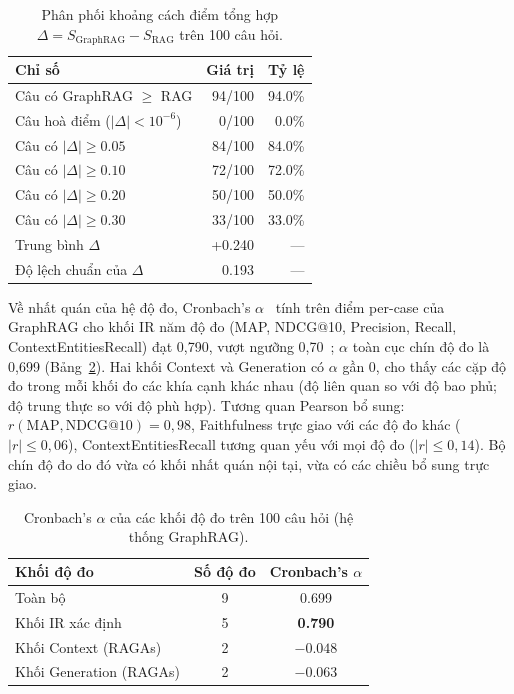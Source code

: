 \begin{table}[h]
\centering
\caption{Phân phối khoảng cách điểm tổng hợp $\Delta = S_{\text{GraphRAG}} - S_{\text{RAG}}$ trên 100 câu hỏi.}
\label{tab:discrimination}
\begin{tabular}{lrr}
\hline
\textbf{Chỉ số} & \textbf{Giá trị} & \textbf{Tỷ lệ} \\
\hline
Câu có GraphRAG $\geq$ RAG & 94/100 & 94.0\% \\
Câu hoà điểm ($|\Delta| < 10^{-6}$) &  0/100 &  0.0\% \\
Câu có $|\Delta| \geq 0.05$ & 84/100 & 84.0\% \\
Câu có $|\Delta| \geq 0.10$ & 72/100 & 72.0\% \\
Câu có $|\Delta| \geq 0.20$ & 50/100 & 50.0\% \\
Câu có $|\Delta| \geq 0.30$ & 33/100 & 33.0\% \\
\hline
Trung bình $\Delta$ & +0.240 & --- \\
Độ lệch chuẩn của $\Delta$ &  0.193 & --- \\
\hline
\end{tabular}
\end{table}

Về nhất quán của hệ độ đo, Cronbach's $\alpha$~\cite{cronbach1951alpha} tính trên điểm per-case của GraphRAG cho khối IR năm độ đo (MAP, NDCG@10, Precision, Recall, ContextEntitiesRecall) đạt 0,790, vượt ngưỡng 0,70~\cite{nunnally1978psychometric}; $\alpha$ toàn cục chín độ đo là 0,699 (Bảng~\ref{tab:consistency}). Hai khối Context và Generation có $\alpha$ gần 0, cho thấy các cặp độ đo trong mỗi khối đo các khía cạnh khác nhau (độ liên quan so với độ bao phủ; độ trung thực so với độ phù hợp). Tương quan Pearson bổ sung: $r(\text{MAP}, \text{NDCG@10}) = 0{,}98$, Faithfulness trực giao với các độ đo khác ($|r| \leq 0{,}06$), ContextEntitiesRecall tương quan yếu với mọi độ đo ($|r| \leq 0{,}14$). Bộ chín độ đo do đó vừa có khối nhất quán nội tại, vừa có các chiều bổ sung trực giao.

\begin{table}[h]
\centering
\caption{Cronbach's $\alpha$ của các khối độ đo trên 100 câu hỏi (hệ thống GraphRAG).}
\label{tab:consistency}
\begin{tabular}{lcc}
\hline
\textbf{Khối độ đo} & \textbf{Số độ đo} & \textbf{Cronbach's $\alpha$} \\
\hline
Toàn bộ                   & 9 & 0.699 \\
Khối IR xác định          & 5 & \textbf{0.790} \\
Khối Context (RAGAs)      & 2 & $-0.048$ \\
Khối Generation (RAGAs)   & 2 & $-0.063$ \\
\hline
\end{tabular}
\end{table}


